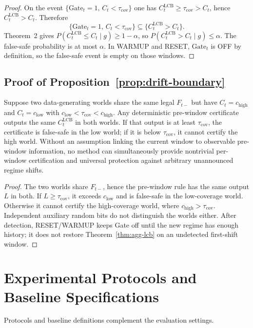 \begin{proof}
On the event $\{\mathrm{Gate}_t=1,\,C_t<\tau_{\mathrm{cov}}\}$ one has
$C^{\mathrm{LCB}}_t\ge\tau_{\mathrm{cov}}>C_t$, hence
$C^{\mathrm{LCB}}_t>C_t$.  Therefore
\[
 \{\mathrm{Gate}_t=1,\,C_t<\tau_{\mathrm{cov}}\}
 \subseteq
 \{C^{\mathrm{LCB}}_t>C_t\}.
\]
Theorem~2 gives $P(C^{\mathrm{LCB}}_t\le C_t\mid g)\ge 1-\alpha$,
so $P(C^{\mathrm{LCB}}_t>C_t\mid g)\le\alpha$.  The false-safe probability is
at most $\alpha$.  In WARMUP and RESET, $\mathrm{Gate}_t$ is OFF by definition,
so the false-safe event is empty on those windows.
\end{proof}

\subsection{Proof of Proposition~\ref{prop:drift-boundary}}
\begin{proposition}
\label{prop:drift-boundary}
Suppose two data-generating worlds share the same legal $F_{t-}$ but have
$C_t=c_{\mathrm{high}}$ and $C_t=c_{\mathrm{low}}$ with
$c_{\mathrm{low}}<\tau_{\mathrm{cov}}<c_{\mathrm{high}}$.  Any deterministic
pre-window certificate outputs the same $C^{\mathrm{LCB}}_t$ in both worlds.
If that output is at least $\tau_{\mathrm{cov}}$, the certificate is
false-safe in the low world; if it is below $\tau_{\mathrm{cov}}$, it cannot
certify the high world.  Without an assumption linking the current window to
observable pre-window information, no method can simultaneously provide
nontrivial per-window certification and universal protection against
arbitrary unannounced regime shifts.
\end{proposition}

\begin{proof}
The two worlds share $F_{t-}$, hence the pre-window rule has the same output
$L$ in both. If $L\ge\tau_{\mathrm{cov}}$, it exceeds $c_{\mathrm{low}}$
and is false-safe in the low-coverage world. Otherwise it cannot certify the
high-coverage world, where $c_{\mathrm{high}}>\tau_{\mathrm{cov}}$.
Independent auxiliary random bits do not distinguish the worlds either.
After detection, RESET/WARMUP keeps Gate off until the new regime has enough
history; it does not restore Theorem~\ref{thm:agg-lcb} on an undetected first-shift window.
\end{proof}

\section{Experimental Protocols and Baseline Specifications}
Protocols and baseline definitions complement the evaluation settings.

